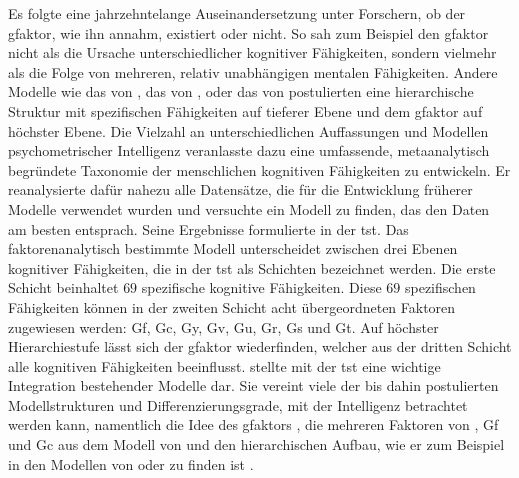 \documentclass[11pt, twoside, a4paper]{book}		%
\begin{document}
Es folgte eine jahrzehntelange Auseinandersetzung unter Forschern, ob der \gls{gfaktor}, wie ihn \citeauthor{Spearman1927} annahm, existiert oder nicht. So sah zum Beispiel \citet{Thurstone1938} den \gls{gfaktor} nicht als die Ursache unterschiedlicher kognitiver Fähigkeiten, sondern vielmehr als die Folge von mehreren, relativ unabhängigen mentalen Fähigkeiten. 
Andere Modelle wie das von \citet{Vernon1950}, das von \citet{Cattell1971}, oder das von \citet{Jaeger1984} postulierten eine hierarchische Struktur mit spezifischen Fähigkeiten auf tieferer Ebene und dem \gls{gfaktor} auf höchster Ebene. 
Die Vielzahl an unterschiedlichen Auffassungen und Modellen psychometrischer Intelligenz veranlasste \citet{Carroll1993} dazu eine umfassende, meta\-ana\-ly\-tisch begründete Taxonomie der menschlichen kognitiven Fähigkeiten zu entwickeln. Er reanalysierte dafür nahezu alle Datensätze, die für die Entwicklung früherer Modelle verwendet wurden und versuchte ein Modell zu finden, das den Daten am besten entsprach. Seine Ergebnisse formulierte \citeauthor{Carroll1993} in der \gls{tst}.
Das faktorenanalytisch bestimmte Modell unterscheidet zwischen drei Ebenen kognitiver Fähigkeiten, die in der \gls{tst} als Schichten bezeichnet werden. Die erste Schicht beinhaltet $69$ spezifische kognitive Fähigkeiten. Diese $69$ spezifischen Fähigkeiten können in der zweiten Schicht acht übergeordneten Faktoren zugewiesen werden: \gls{Gf}, \gls{Gc}, \gls{Gy}, \gls{Gv}, \gls{Gu}, \gls{Gr}, \gls{Gs} und \gls{Gt}.
Auf höchster Hierarchiestufe lässt sich der \gls{gfaktor} wiederfinden, welcher aus der dritten Schicht alle kognitiven Fähigkeiten beeinflusst.
\citeauthor{Carroll1993} stellte mit der \gls{tst} eine wichtige Integration bestehender Modelle dar. 
Sie vereint viele der bis dahin postulierten Modellstrukturen und Differenzierungsgrade, mit der Intelligenz betrachtet werden kann, namentlich die Idee des \gls{gfaktor}s \citep{Spearman1904, Spearman1927}, die mehreren Faktoren von \citet{Thurstone1938}, \gls{Gf} und \gls{Gc} aus dem Modell von \citet{Cattell1971} und den hierarchischen Aufbau, wie er zum Beispiel in den Modellen von \citet{Vernon1950} oder \citet{Jaeger1984} zu finden ist \citep[für Erweiterungen der \gls{tst} siehe][]{McGrew2005, McGrew2009}.
\end{document}
